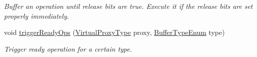 \begin{DoxyCompactItemize}
\begin{DoxyCompactList}\small\item\em Buffer an operation until release bits are true. Execute it if the release bits are set properly immediately. \end{DoxyCompactList}\item 
void \hyperlink{structvt_1_1vrt_1_1collection_1_1_collection_manager_a8019cad3c48d5697ce22ad4ed853f197}{trigger\+Ready\+Ops} (\hyperlink{namespacevt_a1b417dd5d684f045bb58a0ede70045ac}{Virtual\+Proxy\+Type} proxy, \hyperlink{namespacevt_1_1vrt_1_1collection_a1b1b082e2ff4e9e5d1b7227acd78db3f}{Buffer\+Type\+Enum} type)
\begin{DoxyCompactList}\small\item\em Trigger ready operation for a certain type. \end{DoxyCompactList}\end{DoxyCompactItemize}
